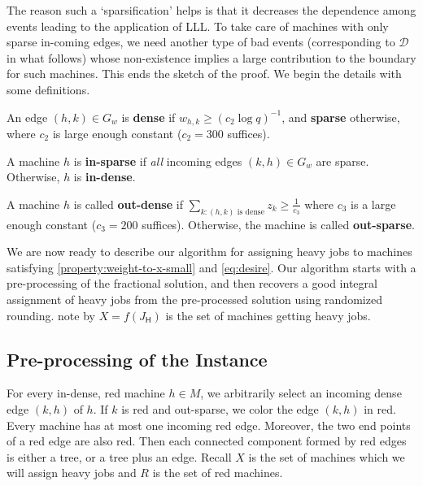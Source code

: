 \documentclass[11pt]{article}
\newenvironment{definition}{\begin{Definition}}{\end{Definition}}
\newtheorem{definition}[lemma]{Definition}
\newcounter{prop}
\newcommand{\cD}{\mathscr{D}}
\newcommand{\sfH}{{\mathsf H}}
\begin{document}
The reason such a `sparsification' helps is that it decreases the dependence among events leading to the application of LLL. To take care of machines with only sparse in-coming edges, we need another type of bad events  (corresponding to $\cD$ in what follows) whose non-existence implies a large contribution to the boundary for such machines.  This ends the sketch of the proof.  We begin the details with some definitions.

\begin{definition}
An edge $(h,k) \in G_w$ is {\bf dense} if ${w_{h,k}}\geq (c_2\log q)^{-1}$, and {\bf sparse} otherwise, where $c_2$ is large enough constant ($c_2 = 300$ suffices).
\end{definition}

\begin{definition}
A machine $h$ is {\bf in-sparse} if {\em all} incoming edges $(k,h)\!\!\in\!\! G_w$ are sparse. Otherwise, $h$ is  {\bf in-dense}.
\end{definition}

\begin{definition}
A machine $h$ is called {\bf out-dense} if $\sum_{k: (h,k) \text{ is dense}} z_k \geq \frac{1}{c_3}$ where $c_3$ is a large enough constant ($c_3 = 200$ suffices). Otherwise, the machine is called {\bf out-sparse}.
\end{definition}

We are now ready to describe our algorithm for assigning heavy jobs to machines satisfying \ref{property:weight-to-x-small} and \ref{eq:desire}.  Our algorithm starts with a pre-processing of the fractional solution, and then recovers a good integral assignment of heavy jobs from the pre-processed solution using randomized rounding. note by $X = f(J_\sfH)$ is the set of machines getting heavy jobs.

\subsection{Pre-processing of the Instance}\label{sec:preprocessing}
For every in-dense, red machine $h \in M$, we arbitrarily select an incoming dense edge $(k, h)$ of $h$.  If $k$ is red and out-sparse, we color the edge $(k, h)$ in  red. Every machine has at most one incoming red edge. Moreover, the two end points of a red edge are also red. Then each connected component formed by red edges is either a tree, or a tree plus an edge. Recall $X$ is the set of machines which we will assign heavy jobs and $R$ is the set of red machines.
\end{document}
